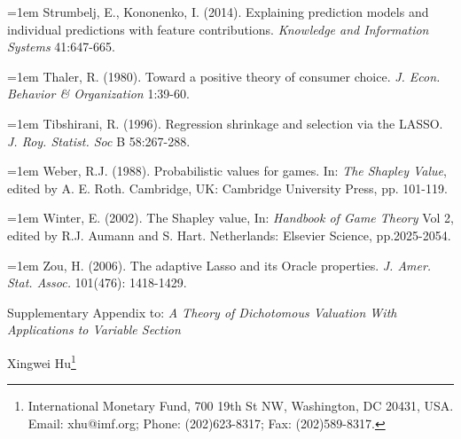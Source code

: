 \documentclass[a4paper,12pt]{article}
\begin{document}
\hangindent=1em
\noindent  Strumbelj, E.,   Kononenko, I. (2014).
Explaining prediction models and individual predictions with feature contributions.
\textit{Knowledge and Information Systems} 41:647-665.

\hangindent=1em
\noindent  Thaler, R. (1980).
Toward a positive theory of consumer choice. 
\textit{J.  Econ. Behavior \& Organization} 1:39-60. 

\hangindent=1em
\noindent  Tibshirani, R. (1996).
Regression shrinkage and selection via the LASSO.
\textit{J. Roy. Statist. Soc}  B  58:267-288. 

\hangindent=1em
\noindent Weber, R.J. (1988).
Probabilistic values for games.
In: \textit{The Shapley Value}, edited by A. E. Roth.
Cambridge, UK: Cambridge University Press, pp. 101-119.

\hangindent=1em
\noindent  Winter, E. (2002).
The Shapley value,
In: \textit{Handbook of Game Theory} Vol 2,  edited by R.J. Aumann and S. Hart.
Netherlands: Elsevier Science, pp.2025-2054.

\hangindent=1em
\noindent  Zou, H. (2006).
The adaptive Lasso and its Oracle properties.
\textit{J. Amer. Stat. Assoc.} 101(476): 1418-1429.
















\clearpage
\newpage
\setcounter{page}{1}
\begin{center}
\Large{
Supplementary Appendix to: \textit{A Theory of Dichotomous Valuation With Applications to Variable Section}
}

\vskip 1cm
Xingwei Hu\footnote{International Monetary Fund, 700 19th St NW, Washington, DC 20431, USA. Email: xhu@imf.org; Phone: (202)623-8317; Fax: (202)589-8317.}
\end{center}
\end{document}
